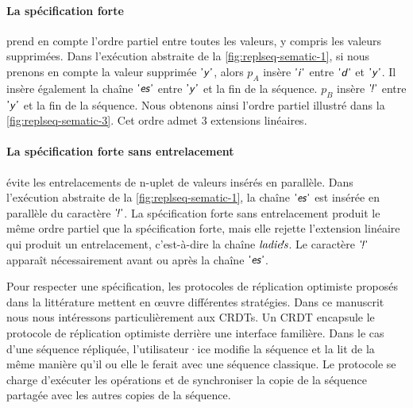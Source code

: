 \paragraph{La spécification forte}\autocite{attiyai_2016_spec-text-editing} prend en  compte l'ordre partiel entre toutes les valeurs, y compris les valeurs supprimées.
Dans l'exécution abstraite de la \autoref{fig:replseq-sematic-1}, si nous prenons en compte la valeur supprimée $\textsf{'\textit{y}'}$, alors $p_A$ insère $\textsf{'\textit{i}'}$ entre $\textsf{'\textit{d}'}$ et $\textsf{'\textit{y}'}$.
Il insère également la chaîne $\textsf{'\textit{es}'}$ entre $\textsf{'\textit{y}'}$ et la fin de la séquence.
$p_B$ insère $\textsf{'\textit{\negthinspace!}'}$ entre $\textsf{'\textit{y}'}$ et la fin de la séquence.
Nous obtenons ainsi l'ordre partiel illustré dans la \autoref{fig:replseq-sematic-3}.
Cet ordre admet 3 extensions linéaires.

\clearpage %

\paragraph{La spécification forte sans entrelacement}\autocite{kleppmann2019_interleaving,kleppmann2018opsets} évite les entrelacements de n-uplet de valeurs insérés en parallèle.
Dans l'exécution abstraite de la \autoref{fig:replseq-sematic-1}, la chaîne $\textsf{'\textit{es}'}$ est insérée en parallèle du caractère $\textsf{'\textit{\negthinspace!}'}$.
La spécification forte sans entrelacement produit le même ordre partiel que la spécification forte, mais elle rejette l'extension linéaire qui produit un entrelacement, c'est-à-dire la chaîne $\textit{ladie\textit{\negthinspace!}s}$.
Le caractère $\textsf{'\textit{\negthinspace!}'}$ apparaît nécessairement avant ou après la chaîne $\textsf{'\textit{es}'}$.

\medskip %

Pour respecter une spécification, les protocoles de réplication optimiste proposés dans la littérature mettent en œuvre différentes stratégies.
Dans ce manuscrit nous nous intéressons particulièrement aux \acp{CRDT}.
Un \ac{CRDT} encapsule le protocole de réplication optimiste derrière une interface familière.
Dans le cas d'une séquence répliquée, l'utilisateur·ice modifie la séquence et la lit de la même manière qu'il ou elle le ferait avec une séquence classique.
Le protocole se charge d'exécuter les opérations et de synchroniser la copie de la séquence partagée avec les autres copies de la séquence.

